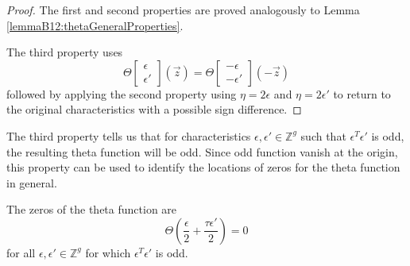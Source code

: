 \begin{proof}
    The first and second properties are proved analogously to Lemma \ref{lemmaB12:thetaGeneralProperties}.

    The third property uses
    \begin{equation}
        \Theta\begin{bmatrix}\epsilon \\ \epsilon'\end{bmatrix}(\vec z) = \Theta\begin{bmatrix}-\epsilon \\ -\epsilon'\end{bmatrix}(-\vec z)
    \end{equation}
    followed by applying the second property using $\eta=2\epsilon$ and $\eta=2\epsilon'$ to return to the original characteristics with a possible sign difference.
\end{proof}

The third property tells us that for characteristics $\epsilon,\epsilon' \in \mathbb Z^g$ such that $\epsilon^T\epsilon'$ is odd, the resulting theta function will be odd. Since odd function vanish at the origin, this property can be used to identify the locations of zeros for the theta function in general.

\begin{theorem}\label{thmB12:OddLocations}
    The zeros of the theta function are
    \begin{equation}
        \Theta\left(\frac{\epsilon}{2} + \frac{\tau \epsilon'}{2}\right) = 0
    \end{equation}
    for all $\epsilon,\epsilon' \in \mathbb Z^g$ for which $\epsilon^T \epsilon'$ is odd.
\end{theorem}

